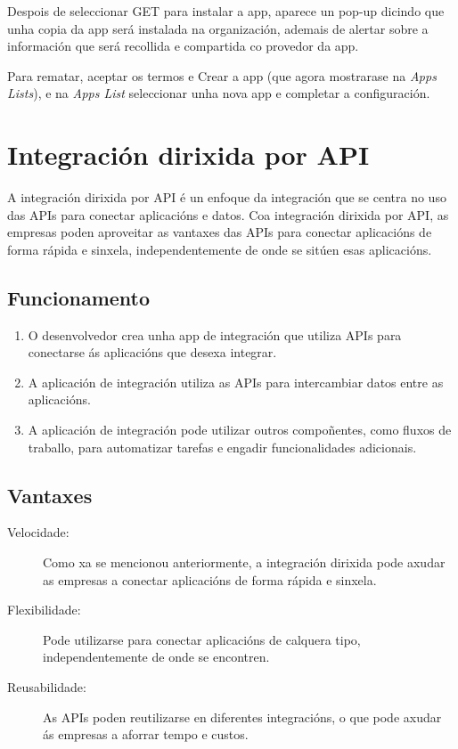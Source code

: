 Despois de seleccionar GET para instalar a app, aparece un pop-up dicindo que unha copia da app será instalada na organización, ademais de alertar sobre a información que será recollida e compartida co provedor da app.

Para rematar, aceptar os termos e Crear a app (que agora mostrarase na \textit{Apps Lists}), e na \textit{Apps List} seleccionar unha nova app e completar a configuración.

\section{Integración dirixida por API}

    A integración dirixida por API é un enfoque da integración que se centra no uso das APIs para conectar aplicacións e datos. Coa integración dirixida por API, as empresas poden aproveitar as vantaxes das APIs para conectar aplicacións de forma rápida e sinxela, independentemente de onde se sitúen esas aplicacións.
   
\subsection{Funcionamento}

\begin{enumerate}
    \item O desenvolvedor crea unha app de integración que utiliza APIs para conectarse ás aplicacións que desexa integrar.
    \item A aplicación de integración utiliza as APIs para intercambiar datos entre as aplicacións.
    \item A aplicación de integración pode utilizar outros compoñentes, como fluxos de traballo, para automatizar tarefas e engadir funcionalidades adicionais.
\end{enumerate}

\subsection{Vantaxes}

\begin{description}
    \item[Velocidade:] Como xa se mencionou anteriormente, a integración dirixida pode axudar as empresas a conectar aplicacións de forma rápida e sinxela.
    \item[Flexibilidade:] Pode utilizarse para conectar aplicacións de calquera tipo, independentemente de onde se encontren.
    \item[Reusabilidade:] As APIs poden reutilizarse en diferentes integracións, o que pode axudar ás empresas a aforrar tempo e custos. 
\end{description}

